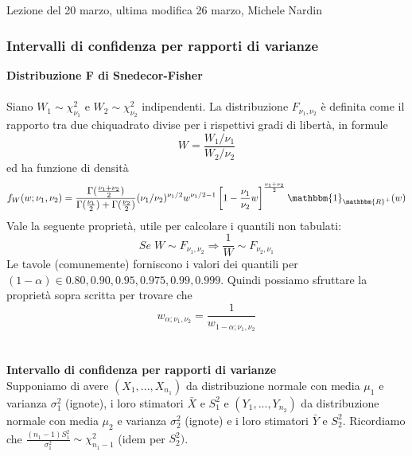 \\ \\
Lezione del 20 marzo, ultima modifica 26 marzo, Michele Nardin

\subsubsection{Intervalli di confidenza per rapporti di varianze}

\textbf{Distribuzione F di Snedecor-Fisher}
\\ \\
Siano $W_1 \sim \chi^2_{\nu_1}$ e $W_2 \sim \chi^2_{\nu_2}$ indipendenti.
La distribuzione $F_{\nu_1,\nu_2}$ è definita come il rapporto tra due chiquadrato divise per i
rispettivi gradi di libertà, in formule $$W=\frac{W_1/\nu_{1}}{W_2/\nu_{2}}$$ ed ha funzione di densità $$f_W(w;\nu_1,\nu_2)=\frac{\Gamma(\frac{\nu_1 + \nu_2}{2})}{\Gamma(\frac{\nu_1}{2})+\Gamma(\frac{\nu_2}{2})} (\nu_1 / \nu_2)^{\nu_1 / 2} w^{\nu_1 / 2 - 1} \left[ 1 - \frac{\nu_1}{\nu_2} w  \right]^{\frac{\nu_1 + \nu_2}{2}} \mathbbm{1}_{\mathbbm{R}^+} (w)$$
Vale la seguente proprietà, utile per calcolare i quantili non tabulati:
$$Se \; W \sim F_{\nu_1,\nu_2} \Rightarrow \frac{1}{W} \sim F_{\nu_2,\nu_1}$$
Le tavole (comunemente) forniscono i valori dei quantili per $(1-\alpha) \in {0.80,0.90,0.95,0.975,0.99,0.999}$. Quindi possiamo sfruttare la proprietà sopra scritta per trovare che $$w_{\alpha;\nu_1,\nu_2}=\frac{1}{w_{1-\alpha;\nu_1,\nu_2}}$$
\\ \\
\textbf{Intervallo di confidenza per rapporti di varianze}
\\
 Supponiamo di avere $(X_1,...,X_{n_1})$ da distribuzione normale con media $\mu_1$ e varianza $\sigma_1^2$ (ignote), i loro stimatori $\bar{X}$ e $S^2_1$ e
 $(Y_1,...,Y_{n_2})$ da distribuzione normale con media $\mu_2$ e varianza $\sigma_2^2$ (ignote) e i loro stimatori $\bar{Y}$ e $S^2_2$.
 Ricordiamo che $\frac{(n_1-1)S^2_1}{\sigma^2_1} \sim \chi^2_{n_1 - 1}$ (idem per $S^2_2)$.
 

